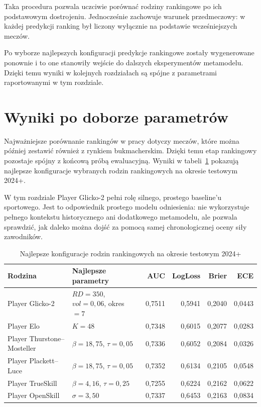 Taka procedura pozwala uczciwie porównać rodziny rankingowe po ich podstawowym dostrojeniu.
Jednocześnie zachowuje warunek przedmeczowy: w każdej predykcji ranking był liczony wyłącznie na
podstawie wcześniejszych meczów.

Po wyborze najlepszych konfiguracji predykcje rankingowe zostały wygenerowane ponownie i to one
stanowiły wejście do dalszych eksperymentów metamodelu. Dzięki temu wyniki w kolejnych rozdziałach
są spójne z parametrami raportowanymi w tym rozdziale.

\section{Wyniki po doborze parametrów}

Najważniejsze porównanie rankingów w pracy dotyczy meczów, które można później zestawić również z
rynkiem bukmacherskim. Dzięki temu etap rankingowy pozostaje spójny z końcową próbą ewaluacyjną.
Wyniki w tabeli~\ref{tab:ranking_common_sample_results} pokazują najlepsze konfiguracje wybranych
rodzin rankingowych na okresie testowym 2024+.

W tym rozdziale Player Glicko-2 pełni rolę silnego, prostego baseline'u sportowego. Jest to
odpowiednik prostego modelu odniesienia: nie wykorzystuje pełnego kontekstu historycznego ani
dodatkowego metamodelu, ale pozwala sprawdzić, jak daleko można dojść za pomocą samej
chronologicznej oceny siły zawodników.

\begin{table}[H]
    \centering
    \small
    \caption{Najlepsze konfiguracje rodzin rankingowych na okresie testowym 2024+}
    \label{tab:ranking_common_sample_results}
    \begin{tabular}{p{3.1cm}p{4.1cm}rrrr}
        \toprule
        Rodzina & Najlepsze parametry & AUC & LogLoss & Brier & ECE \\
        \midrule
        Player Glicko-2 & $RD=350$, $vol=0{,}06$, okres $=7$ & 0{,}7511 & 0{,}5941 & 0{,}2040 & 0{,}0443 \\
        Player Elo & $K=48$ & 0{,}7348 & 0{,}6015 & 0{,}2077 & 0{,}0283 \\
        Player Thurstone--Mosteller & $\beta=18{,}75$, $\tau=0{,}05$ & 0{,}7336 & 0{,}6052 & 0{,}2084 & 0{,}0326 \\
        Player Plackett--Luce & $\beta=18{,}75$, $\tau=0{,}05$ & 0{,}7352 & 0{,}6134 & 0{,}2105 & 0{,}0548 \\
        Player TrueSkill & $\beta=4{,}16$, $\tau=0{,}25$ & 0{,}7255 & 0{,}6224 & 0{,}2162 & 0{,}0622 \\
        Player OpenSkill & $\sigma=3{,}50$ & 0{,}7337 & 0{,}6453 & 0{,}2163 & 0{,}0834 \\
        \bottomrule
    \end{tabular}
\end{table}

